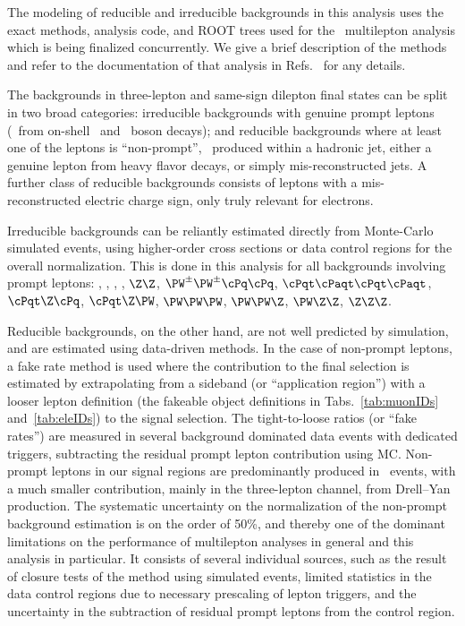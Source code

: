 The modeling of reducible and irreducible backgrounds in this analysis uses the exact methods, analysis code, and ROOT trees used for the \ttH\ multilepton analysis which is being finalized concurrently.
We give a brief description of the methods and refer to the documentation of that analysis in Refs.~\cite{CMS_AN_2016-211,CMS_AN_2017-029} for any details.

The backgrounds in three-lepton and same-sign dilepton final states can be split in two broad categories: irreducible backgrounds with genuine prompt leptons (\ie\ from on-shell \PW\ and \Z\ boson decays); and reducible backgrounds where at least one of the leptons is ``non-prompt'', \ie\ produced within a hadronic jet, either a genuine lepton from heavy flavor decays, or simply mis-reconstructed jets.
A further class of reducible backgrounds consists of leptons with a mis-reconstructed electric charge sign, only truly relevant for electrons.

Irreducible backgrounds can be reliantly estimated directly from Monte-Carlo simulated events, using higher-order cross sections or data control regions for the overall normalization.
This is done in this analysis for all backgrounds involving prompt leptons: \ttW, \ttZ, \ttH, \WZ, $\Z\Z$, $\PW^\pm\PW^\pm\cPq\cPq$, $\cPqt\cPaqt\cPqt\cPaqt$, $\cPqt\Z\cPq$, $\cPqt\Z\PW$, $\PW\PW\PW$, $\PW\PW\Z$, $\PW\Z\Z$, $\Z\Z\Z$.

Reducible backgrounds, on the other hand, are not well predicted by simulation, and are estimated using data-driven methods.
In the case of non-prompt leptons, a fake rate method is used where the contribution to the final selection is estimated by extrapolating from a sideband (or ``application region'') with a looser lepton definition (the fakeable object definitions in Tabs.~\ref{tab:muonIDs} and~\ref{tab:eleIDs}) to the signal selection.
The tight-to-loose ratios (or ``fake rates'') are measured in several background dominated data events with dedicated triggers, subtracting the residual prompt lepton contribution using MC.\@
Non-prompt leptons in our signal regions are predominantly produced in \ttbar\ events, with a much smaller contribution, mainly in the three-lepton channel, from Drell--Yan production.
The systematic uncertainty on the normalization of the non-prompt background estimation is on the order of 50\%, and thereby one of the dominant limitations on the performance of multilepton analyses in general and this analysis in particular.
It consists of several individual sources, such as the result of closure tests of the method using simulated events, limited statistics in the data control regions due to necessary prescaling of lepton triggers, and the uncertainty in the subtraction of residual prompt leptons from the control region.

